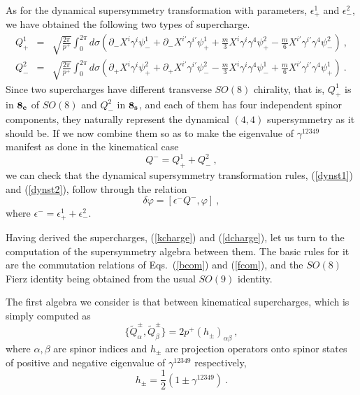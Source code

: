 \documentclass[a4paper,12pt]{article}
\begin{document}
As for the dynamical supersymmetry transformation with parameters,
$\epsilon^1_+$ and $\epsilon^2_-$, we have obtained the following two
types of supercharge.
\begin{eqnarray}
Q^1_+ 
 &=& \sqrt{ \frac{ 2\pi}{p^+} }
    \int^{2 \pi}_0 d \sigma
     \left( \partial_- X^i \gamma^i \psi^1_- 
           + \partial_- X^{i'} \gamma^{i'} \psi^1_+
           + \frac{m}{3} X^i \gamma^i \gamma^4 \psi^2_+
           - \frac{m}{6} X^{i'} \gamma^{i'} \gamma^4 \psi^2_-
     \right) ~,
\nonumber \\
Q^2_- 
  &=& \sqrt{ \frac{ 2\pi}{p^+} }
    \int^{2 \pi}_0 d \sigma
     \left( \partial_+ X^i \gamma^i \psi^2_+ 
           + \partial_+ X^{i'} \gamma^{i'} \psi^2_-
           - \frac{m}{3} X^i \gamma^i \gamma^4 \psi^1_-
           + \frac{m}{6} X^{i'} \gamma^{i'} \gamma^4 \psi^1_+
     \right) ~.
\label{dcharge}
\end{eqnarray}
Since two supercharges have different transverse $SO(8)$ chirality,
that is, $Q^1_+$ is in ${\bf 8_c}$ of $SO(8)$ and $Q^2_-$ in ${\bf
  8_s}$, and each of them has four independent spinor components, they
naturally represent the dynamical $(4,4)$ supersymmetry as it should
be.  If we now combine them so as to make the eigenvalue of
$\gamma^{12349}$ manifest as done in the kinematical case
\begin{equation}
Q^- = Q^1_+ + Q^2_- ~,
\end{equation}
we can check that the dynamical supersymmetry transformation rules,
(\ref{dynst1}) and (\ref{dynst2}), follow through the relation
\begin{equation}
\delta \varphi = [ \epsilon^- Q^- , \varphi ] ~,
\end{equation}
where $\epsilon^- = \epsilon^1_+ + \epsilon^2_-$.

Having derived the supercharges, (\ref{kcharge}) and (\ref{dcharge}),
let us turn to the computation of the supersymmetry algebra between
them.  The basic rules for it are the commutation relations of
Eqs.~(\ref{bcom}) and (\ref{fcom}), and the $SO(8)$ Fierz identity
being obtained from the usual $SO(9)$ identity.

The first algebra we consider is that between kinematical
supercharges, which is simply computed as
\begin{equation}
\{ \widetilde{Q}^\pm_\alpha, \widetilde{Q}^\pm_\beta \} 
= 2 p^+ (h_\pm)_{\alpha \beta} ~,
\end{equation}
where $\alpha, \beta$ are spinor indices and $h_\pm$ are projection
operators onto spinor states of positive and negative eigenvalue of 
$\gamma^{12349}$ respectively,
\begin{equation}
h_\pm = \frac{1}{2} ( 1 \pm \gamma^{12349} ) ~.
\end{equation}
\end{document}
